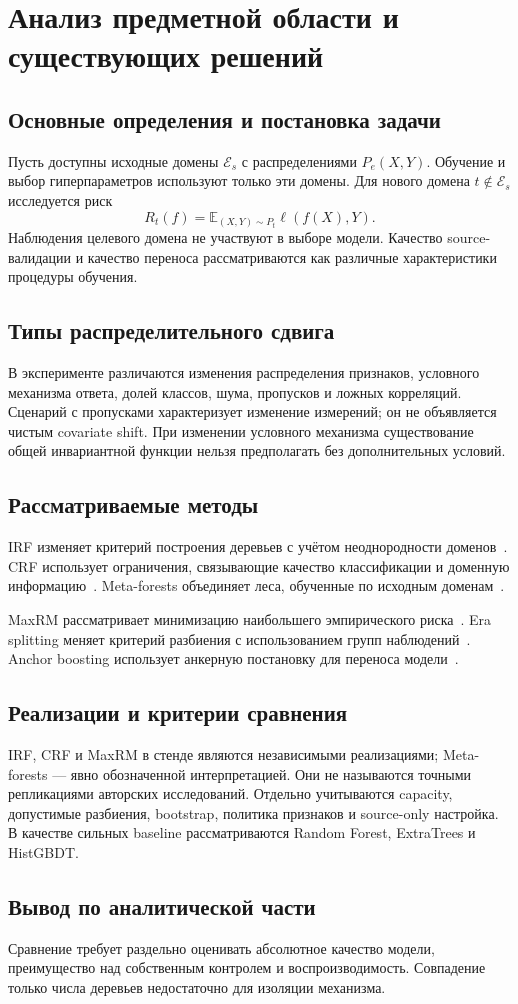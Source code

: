 \chapter{Анализ предметной области и существующих решений}
\section{Основные определения и постановка задачи}
Пусть доступны исходные домены $\mathcal{E}_s$ с распределениями $P_e(X,Y)$. Обучение и выбор гиперпараметров используют только эти домены. Для нового домена $t\notin\mathcal{E}_s$ исследуется риск
\begin{equation}
R_t(f)=\mathbb{E}_{(X,Y)\sim P_t}\ell(f(X),Y).
\end{equation}
Наблюдения целевого домена не участвуют в выборе модели. Качество source-валидации и качество переноса рассматриваются как различные характеристики процедуры обучения.

\section{Типы распределительного сдвига}
В эксперименте различаются изменения распределения признаков, условного механизма ответа, долей классов, шума, пропусков и ложных корреляций. Сценарий с пропусками характеризует изменение измерений; он не объявляется чистым covariate shift. При изменении условного механизма существование общей инвариантной функции нельзя предполагать без дополнительных условий.

\section{Рассматриваемые методы}
IRF изменяет критерий построения деревьев с учётом неоднородности доменов~\cite{irf}. CRF использует ограничения, связывающие качество классификации и доменную информацию~\cite{crf}. Meta-forests объединяет леса, обученные по исходным доменам~\cite{meta}.

MaxRM рассматривает минимизацию наибольшего эмпирического риска~\cite{maxrm}. Era splitting меняет критерий разбиения с использованием групп наблюдений~\cite{era}. Anchor boosting использует анкерную постановку для переноса модели~\cite{anchor}.

\section{Реализации и критерии сравнения}
IRF, CRF и MaxRM в стенде являются независимыми реализациями; Meta-forests --- явно обозначенной интерпретацией. Они не называются точными репликациями авторских исследований. Отдельно учитываются capacity, допустимые разбиения, bootstrap, политика признаков и source-only настройка. В качестве сильных baseline рассматриваются Random Forest, ExtraTrees и HistGBDT.

\section{Вывод по аналитической части}
Сравнение требует раздельно оценивать абсолютное качество модели, преимущество над собственным контролем и воспроизводимость. Совпадение только числа деревьев недостаточно для изоляции механизма.
